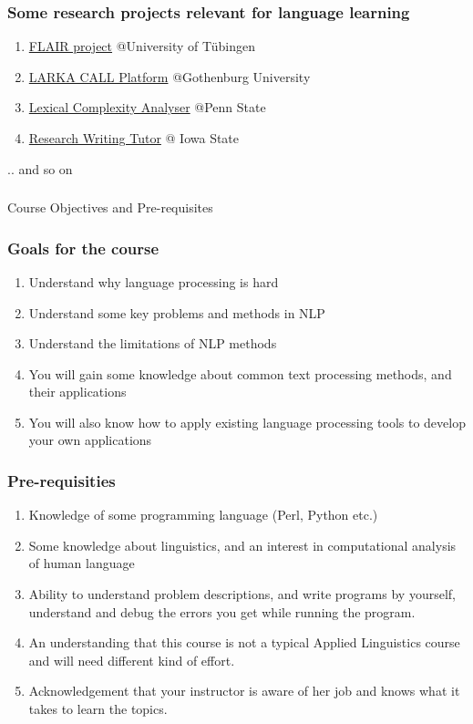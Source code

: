 \documentclass{beamer}
\begin{document}
\begin{frame}
\frametitle{Some research projects relevant for language learning}
\begin{enumerate}
\item \href{http://samos.sfs.uni-tuebingen.de:8080/FLAIR/}{FLAIR project} @University of T\"ubingen
\item \href{https://spraakbanken.gu.se/larka/}{LARKA CALL Platform} @Gothenburg University
\item \href{http://aihaiyang.com/software/lca/}{Lexical Complexity Analyser} @Penn State
\item \href{http://cce.grad-college.iastate.edu/projects/research-writing-tutor}{Research Writing Tutor} @ Iowa State
\end{enumerate}
.. and so on
\end{frame}

\begin{frame}
\frametitle{}
\begin{center}
\Large Course Objectives and Pre-requisites
\end{center}
\end{frame}

\begin{frame}
\frametitle{Goals for the course}
\begin{enumerate}
\item Understand why language processing is hard
\item Understand some key problems and methods in NLP
\item Understand the limitations of NLP methods
\item You will gain some knowledge about common text processing methods, and their applications
\item You will also know how to apply existing language processing tools to develop your own applications
\end{enumerate}
\end{frame}

\begin{frame}
\frametitle{Pre-requisities}
\begin{enumerate}
\item Knowledge of some programming language (Perl, Python etc.) 
\item Some knowledge about linguistics, and an interest in computational analysis of human language
\item Ability to understand problem descriptions, and write programs by yourself, understand and debug the errors you get while running the program.
\item An understanding that this course is not a typical Applied Linguistics course and will need different kind of effort.
\item Acknowledgement that your instructor is aware of her job and knows what it takes to learn the topics.
\end{enumerate}
\end{frame}
\end{document}
